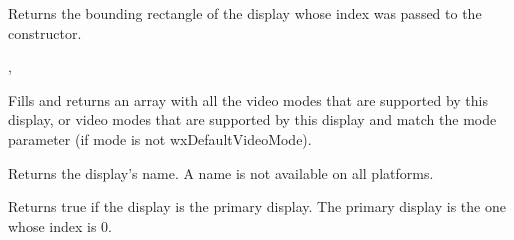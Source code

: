


\label{wxdisplaygetgeometry}


Returns the bounding rectangle of the display whose index was passed to the
constructor.


, 


\label{wxdisplaygetmodes}


Fills and returns an array with all the video modes that
are supported by this display, or video modes that are 
supported by this display and match the mode parameter
(if mode is not wxDefaultVideoMode).


\label{wxdisplaygetname}


Returns the display's name.  A name is not available on all platforms.


\label{wxdisplayisprimary}


Returns true if the display is the primary display.  The primary display is the
one whose index is 0.

